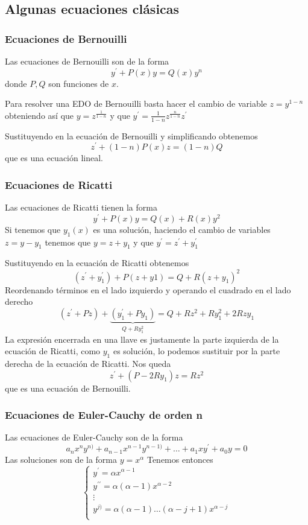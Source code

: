 \subsection{Algunas ecuaciones clásicas}
\subsubsection{Ecuaciones de Bernouilli}
Las ecuaciones de Bernouilli son de la forma $$y^\prime + P(x)y=Q(x)y^n$$ donde $P,Q$ son funciones de $x$.

\begin{method}
Para resolver una EDO de Bernouilli basta hacer el cambio de variable $z=y^{1-n}$ obteniendo así que $y=z^{\frac{1}{1-n}}$ y que $y^\prime = \frac{1}{1-n}z^{\frac{n}{1-n}}z^\prime$

Sustituyendo en la ecuación de Bernouilli y simplificando obtenemos
$$z^\prime+(1-n)P(x)z=(1-n)Q$$ que es una ecuación lineal.
\end{method}

\subsubsection{Ecuaciones de Ricatti}
Las ecuaciones de Ricatti tienen la forma $$y^\prime +P(x)y=Q(x) + R(x)y^2$$
Si tenemos que $y_1(x)$ es una solución, haciendo el cambio de variables $z=y-y_1$ tenemos que $y=z+y_1$ y que $y^\prime=z^\prime+y_1^\prime$

Sustituyendo en la ecuación de Ricatti obtenemos
$$(z^\prime+y_1^\prime)+P(z+y1) = Q + R(z+y_1)^2$$
Reordenando términos en el lado izquierdo y operando el cuadrado en el lado derecho
$$(z^\prime+Pz)+\underbrace{(y_1^\prime+Py_1)}_{Q+Ry_1^2} = Q+Rz^2+Ry_1^2+2Rzy_1$$
La expresión encerrada en una llave es justamente la parte izquierda de la ecuación de Ricatti, como $y_1$ es solución, lo podemos sustituir por la parte derecha de la ecuación de Ricatti. Nos queda
$$z^\prime+(P-2Ry_1)z=Rz^2$$
que es una ecuación de Bernouilli.

\subsubsection{Ecuaciones de Euler-Cauchy de orden n}
Las ecuaciones de Euler-Cauchy son de la forma
$$a_nx^ny^{n)}+a_{n-1}x^{n-1}y^{n-1)}+\hdots+a_1xy^\prime+a_0y=0$$
Las soluciones son de la forma $y=x^\alpha$
Tenemos entonces
\begin{equation*}
  \left\lbrace
  \begin{array}{l}
     y^\prime = \alpha x^{\alpha-1}\\
     y^{\prime\prime} = \alpha(\alpha-1)x^{\alpha-2}\\
     \vdots\\
     y^{j)}=\alpha(\alpha-1)\hdots(\alpha-j+1)x^{\alpha-j}\\
  \end{array}
  \right.
\end{equation*}

